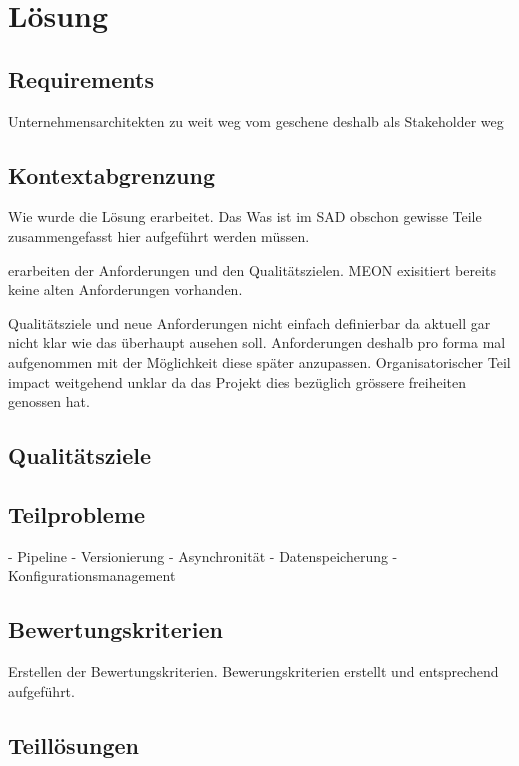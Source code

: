 \chapter{Lösung}

\section{Requirements}

Unternehmensarchitekten zu weit weg vom geschene deshalb als Stakeholder weg

\section{Kontextabgrenzung}

Wie wurde die Lösung erarbeitet. Das Was ist im SAD obschon gewisse Teile zusammengefasst hier aufgeführt werden müssen.

erarbeiten der Anforderungen und den Qualitätszielen. MEON exisitiert bereits keine alten Anforderungen vorhanden. 

Qualitätsziele und neue Anforderungen nicht einfach definierbar da aktuell gar nicht klar wie das überhaupt ausehen soll. Anforderungen deshalb pro forma mal aufgenommen mit der Möglichkeit diese später anzupassen.
Organisatorischer Teil impact weitgehend unklar da das Projekt dies bezüglich grössere freiheiten genossen hat. 

\section{Qualitätsziele}

\section{Teilprobleme}

- Pipeline
- Versionierung
- Asynchronität
- Datenspeicherung
- Konfigurationsmanagement

\section{Bewertungskriterien}

Erstellen der Bewertungskriterien.
Bewerungskriterien erstellt und entsprechend aufgeführt.

\section{Teillösungen}

